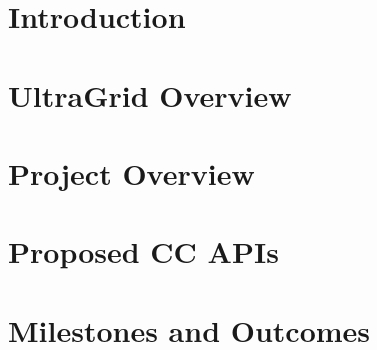 \documentclass[a4paper,10pt]{article}
\begin{document}

\pagestyle{fancy}
\addtolength{\headheight}{\baselineskip}
\newcommand{\chaptermark}[1]{%
\markboth{#1}%
{}}
\lhead{}
\chead{}

\rhead{\nouppercase{{\sl \leftmark}} \hspace{0.5cm} \makebox[1cm][r]{%
\thepage}}

\cfoot{}


\tableofcontents
\newpage

\section{\label{sec:intro}Introduction}


\section{\label{sec:ultragrid}UltraGrid Overview}


\section{\label{sec:overview}Project Overview}


\section{\label{sec:cc-api}Proposed CC APIs}


\section{\label{sec:summary}Milestones and Outcomes} 


%



%
%
\end{document}
